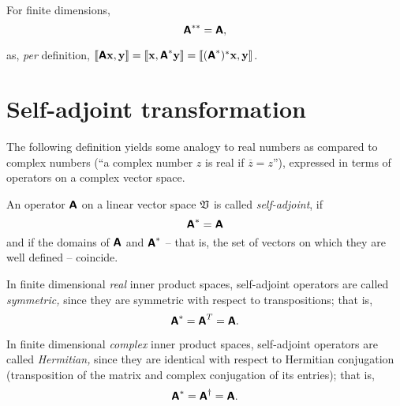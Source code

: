 For finite dimensions,
\begin{equation}
\textsf{\textbf{A}}^{\ast \ast}=
\textsf{\textbf{A}},
\end{equation}

{\color{OliveGreen}\bproof
as, {\it per} definition,
$
\llbracket \textsf{\textbf{A}}{\bf x}, {\bf y}\rrbracket
=
\llbracket {\bf x}, \textsf{\textbf{A}}^\ast{\bf y}\rrbracket
=
\llbracket (\textsf{\textbf{A}}^\ast)^\ast{\bf x}, {\bf y}\rrbracket
$.
\eproof
}




\section{Self-adjoint transformation}
\label{2015-m-ch-fdlvs-self-adjoint}


The following definition yields some analogy to real numbers as compared to complex numbers
(``a complex number $z$ is real if $\overline{z}=z$''),
expressed in terms of operators on a complex vector space.


An operator    $\textsf{\textbf{A}}$   on a linear vector space   ${\frak V}$
is called {\em self-adjoint}, if
\begin{equation}
\textsf{\textbf{A}}^{\ast}=
\textsf{\textbf{A}}
\end{equation}
and if the domains of $\textsf{\textbf{A}}$ and $\textsf{\textbf{A}}^{\ast}$
-- that is, the set of vectors on which they are well defined -- coincide.

In finite dimensional {\em real} inner product spaces,
self-adjoint operators are called {\em symmetric,}
since they are symmetric with respect to transpositions; that is,
\begin{equation}
\textsf{\textbf{A}}^{\ast}= \textsf{\textbf{A}}^{T}=
\textsf{\textbf{A}}.
\end{equation}

In finite dimensional
{\em complex} inner product spaces,
self-adjoint operators are called {\em Hermitian,}
since they are identical with respect to Hermitian conjugation (transposition of the matrix and complex conjugation of its
entries); that is,
\begin{equation}
\textsf{\textbf{A}}^{\ast}= \textsf{\textbf{A}}^{\dagger}=
\textsf{\textbf{A}}.
\end{equation}

